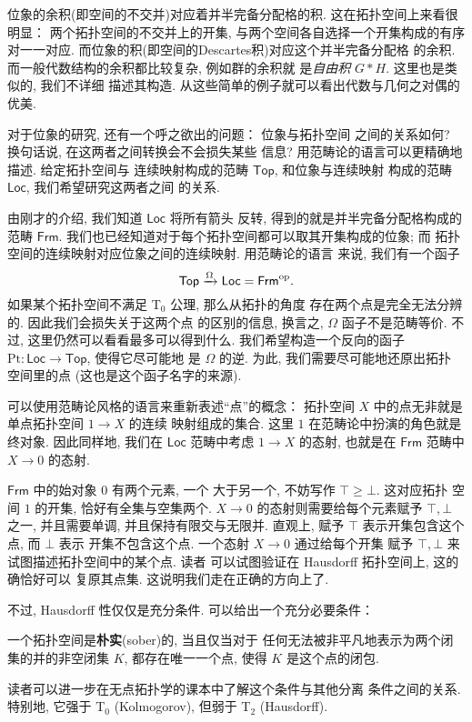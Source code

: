 位象的余积(即空间的不交并)对应着并半完备分配格的积.
这在拓扑空间上来看很明显： 两个拓扑空间的不交并上的开集,
与两个空间各自选择一个开集构成的有序对一一对应.
而位象的积(即空间的Descartes积)对应这个并半完备分配格
的余积. 而一般代数结构的余积都比较复杂, 例如群的余积就
是\emph{自由积} \(G * H\). 这里也是类似的, 我们不详细
描述其构造. 从这些简单的例子就可以看出代数与几何之对偶的
优美.

对于位象的研究, 还有一个呼之欲出的问题： 位象与拓扑空间
之间的关系如何? 换句话说, 在这两者之间转换会不会损失某些
信息? 用范畴论的语言可以更精确地描述. 给定拓扑空间与
连续映射构成的范畴 \(\mathsf{Top}\), 和位象与连续映射
构成的范畴 \(\mathsf{Loc}\), 我们希望研究这两者之间
的关系.

由刚才的介绍, 我们知道 \(\mathsf{Loc}\) 将所有箭头
反转, 得到的就是并半完备分配格构成的范畴 \(\mathsf{Frm}\).
我们也已经知道对于每个拓扑空间都可以取其开集构成的位象; 而
拓扑空间的连续映射对应位象之间的连续映射. 用范畴论的语言
来说, 我们有一个函子
\[\mathsf{Top} \xrightarrow{\Omega} \mathsf{Loc}
= \mathsf{Frm}^\mathrm{op}.\]
如果某个拓扑空间不满足 T\(_0\) 公理, 那么从拓扑的角度
存在两个点是完全无法分辨的. 因此我们会损失关于这两个点
的区别的信息, 换言之, \(\Omega\) 函子不是范畴等价.
不过, 这里仍然可以看看最多可以得到什么.
我们希望构造一个反向的函子 \(\mathrm{Pt} :
\mathsf{Loc} \to \mathsf{Top}\), 使得它尽可能地
是 \(\Omega\) 的逆. 为此, 我们需要尽可能地还原出拓扑
空间里的点 (这也是这个函子名字的来源).

可以使用范畴论风格的语言来重新表述“点”的概念： 拓扑空间
\(X\) 中的点无非就是单点拓扑空间 \(1 \to X\) 的连续
映射组成的集合. 这里 \(1\) 在范畴论中扮演的角色就是
终对象. 因此同样地, 我们在 \(\mathsf{Loc}\) 范畴中考虑
\(1 \to X\) 的态射, 也就是在 \(\mathsf{Frm}\) 范畴中
\(X \to 0\) 的态射.

\(\mathsf{Frm}\) 中的始对象 \(0\) 有两个元素, 一个
大于另一个, 不妨写作 \(\top \ge \bot\). 这对应拓扑
空间 \(1\) 的开集, 恰好有全集与空集两个.
\(X \to 0\) 的态射则需要给每个元素赋予 \(\top, \bot\)
之一, 并且需要单调, 并且保持有限交与无限并. 直观上,
赋予 \(\top\) 表示开集包含这个点, 而 \(\bot\) 表示
开集不包含这个点. 一个态射 \(X \to 0\) 通过给每个开集
赋予 \(\top,\bot\) 来试图描述拓扑空间中的某个点. 读者
可以试图验证在 Hausdorff 拓扑空间上, 这的确恰好可以
复原其点集. 这说明我们走在正确的方向上了.

不过, Hausdorff 性仅仅是充分条件. 可以给出一个充分必要条件：
\begin{definition}
一个拓扑空间是\textbf{朴实}(sober)的, 当且仅当对于
任何无法被非平凡地表示为两个闭集的并的非空闭集 \(K\),
都存在唯一一个点, 使得 \(K\) 是这个点的闭包.
\end{definition}
读者可以进一步在无点拓扑学的课本中了解这个条件与其他分离
条件之间的关系. 特别地, 它强于 T\(_0\) (Kolmogorov),
但弱于 T\(_2\) (Hausdorff).

